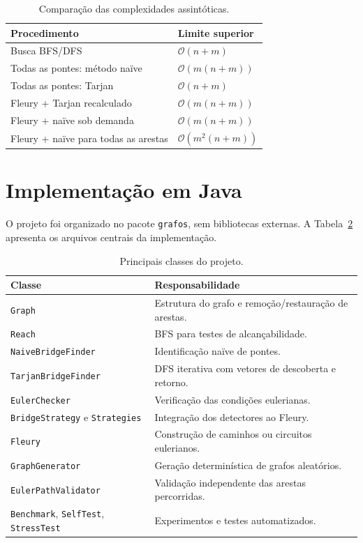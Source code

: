 \documentclass[12pt,a4paper]{article}
\newcommand{\ordem}[1]{\mathcal{O}\!\left(#1\right)}
\begin{document}
\begin{table}[H]
\centering\small
\caption{Comparação das complexidades assintóticas.}
\label{tab:complexidade}
\begin{tabular}{@{}p{7.0cm}p{5.1cm}@{}}
\toprule
Procedimento & Limite superior \\
\midrule
Busca BFS/DFS & $\ordem{n+m}$ \\
Todas as pontes: método naïve & $\ordem{m(n+m)}$ \\
Todas as pontes: Tarjan & $\ordem{n+m}$ \\
Fleury + Tarjan recalculado & $\ordem{m(n+m)}$ \\
Fleury + naïve sob demanda & $\ordem{m(n+m)}$ \\
Fleury + naïve para todas as arestas & $\ordem{m^2(n+m)}$ \\
\bottomrule
\end{tabular}
\end{table}

\section{Implementação em Java}
O projeto foi organizado no pacote \texttt{grafos}, sem bibliotecas externas.
A Tabela~\ref{tab:arquivos} apresenta os arquivos centrais da implementação.

\begin{table}[H]
\centering\small
\caption{Principais classes do projeto.}
\label{tab:arquivos}
\begin{tabular}{@{}p{5cm}p{7.2cm}@{}}
\toprule
Classe & Responsabilidade \\
\midrule
\texttt{Graph} & Estrutura do grafo e remoção/restauração de arestas. \\
\texttt{Reach} & BFS para testes de alcançabilidade. \\
\texttt{NaiveBridgeFinder} & Identificação naïve de pontes. \\
\texttt{TarjanBridgeFinder} & DFS iterativa com vetores de descoberta e retorno. \\
\texttt{EulerChecker} & Verificação das condições eulerianas. \\
\texttt{BridgeStrategy} e \texttt{Strategies} & Integração dos detectores ao Fleury. \\
\texttt{Fleury} & Construção de caminhos ou circuitos eulerianos. \\
\texttt{GraphGenerator} & Geração determinística de grafos aleatórios. \\
\texttt{EulerPathValidator} & Validação independente das arestas percorridas. \\
\texttt{Benchmark}, \texttt{SelfTest}, \texttt{StressTest} & Experimentos e testes automatizados. \\
\bottomrule
\end{tabular}
\end{table}
\end{document}
